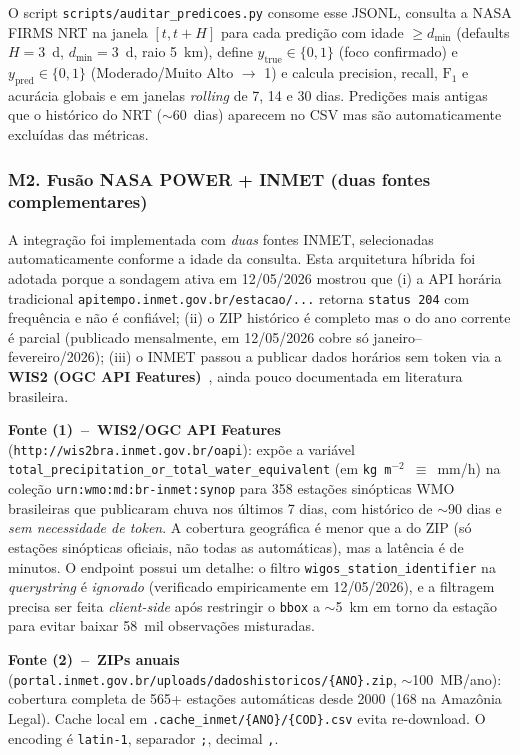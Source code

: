 O script \texttt{scripts/auditar\_predicoes.py} consome esse JSONL, consulta a NASA FIRMS NRT na janela $[t, t+H]$ para cada predição com idade $\geq d_{\min}$ (defaults $H=3$~d, $d_{\min}=3$~d, raio 5~km), define $y_{\text{true}} \in \{0,1\}$ (foco confirmado) e $y_{\text{pred}} \in \{0,1\}$ (Moderado/Muito Alto $\to$ 1) e calcula precision, recall, $\text{F}_1$ e acurácia globais e em janelas \emph{rolling} de 7, 14 e 30 dias. Predições mais antigas que o histórico do NRT ($\sim 60$~dias) aparecem no CSV mas são automaticamente excluídas das métricas.

\subsubsection*{M2. Fusão NASA POWER + INMET (duas fontes complementares)}

A integração foi implementada com \emph{duas} fontes INMET, selecionadas automaticamente conforme a idade da consulta. Esta arquitetura híbrida foi adotada porque a sondagem ativa em 12/05/2026 mostrou que (i) a API horária tradicional \texttt{apitempo.inmet.gov.br/estacao/...} retorna \texttt{status 204} com frequência e não é confiável; (ii) o ZIP histórico é completo mas o do ano corrente é parcial (publicado mensalmente, em 12/05/2026 cobre só janeiro--fevereiro/2026); (iii) o INMET passou a publicar dados horários sem token via a \textbf{WIS2 (OGC API Features)}~\cite{inmetnormais}, ainda pouco documentada em literatura brasileira.

\textbf{Fonte (1)~--~WIS2/OGC API Features} (\texttt{http://wis2bra.inmet.gov.br/oapi}): expõe a variável \texttt{total\_precipitation\_or\_total\_water\_equivalent} (em \texttt{kg\,m$^{-2}$}~$\equiv$~mm/h) na coleção \texttt{urn:wmo:md:br-inmet:synop} para 358 estações sinópticas WMO brasileiras que publicaram chuva nos últimos 7 dias, com histórico de $\sim$90 dias e \emph{sem necessidade de token}. A cobertura geográfica é menor que a do ZIP (só estações sinópticas oficiais, não todas as automáticas), mas a latência é de minutos. O endpoint possui um detalhe: o filtro \texttt{wigos\_station\_identifier} na \emph{querystring} é \emph{ignorado} (verificado empiricamente em 12/05/2026), e a filtragem precisa ser feita \emph{client-side} após restringir o \texttt{bbox} a $\sim$5~km em torno da estação para evitar baixar 58~mil observações misturadas.

\textbf{Fonte (2)~--~ZIPs anuais} (\texttt{portal.inmet.gov.br/uploads/dadoshistoricos/\{ANO\}.zip}, $\sim$100~MB/ano): cobertura completa de 565+ estações automáticas desde 2000 (168 na Amazônia Legal). Cache local em \texttt{.cache\_inmet/\{ANO\}/\{COD\}.csv} evita re-download. O encoding é \texttt{latin-1}, separador \texttt{;}, decimal \texttt{,}.

